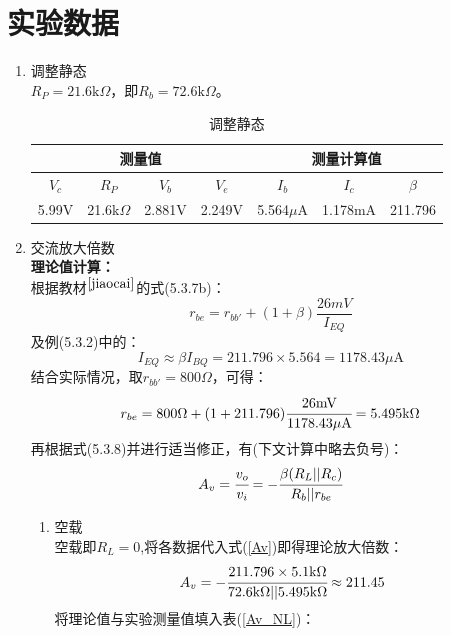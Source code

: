 \documentclass[a4paper]{article}
\begin{document}
\section{实验数据}
\begin{enumerate}
\item 调整静态\\
$R_P = 21.6\text{k}\Omega$，即$R_b = 72.6\text{k}\Omega$。
\begin{table}[!h]
\centering
\caption{调整静态}
\label{Q}
\begin{tabular}{c|c|c|c|c|c|c}
\hline
\multicolumn{4}{c|}{测量值}               & \multicolumn{3}{c}{测量计算值}      \\ \hline
$V_c$ & $R_P$         & $V_b$  & $V_e$  & $I_b$       & $I_c$   & $\beta$ \\ \hline
5.99V & 21.6k$\Omega$ & 2.881V & 2.249V & 5.564$\mu$A & 1.178mA & 211.796 \\ \hline
\end{tabular}
\end{table}
\item 交流放大倍数\\
\textbf{理论值计算：}\\
根据教材$^{\cite{jiaocai}}$的式(5.3.7b)：
\begin{equation}
r_{be} = r_{bb'} + (1+\beta)\frac{26mV}{I_{EQ}}\label{rbe}
\end{equation}
及例(5.3.2)中的：
\begin{equation}
I_{EQ} \approx \beta I_{BQ}=211.796\times5.564 =1178.43 \mu\text{A}
\end{equation}
结合实际情况，取$r_{bb'} = 800\Omega$，可得：
\begin{equation}
r_{be} = 800\Omega + (1+211.796)\cfrac{26\text{mV}}{1178.43 \mu\text{A}} = 5.495\text{k}\Omega
\end{equation}
再根据式(5.3.8)并进行适当修正，有(下文计算中略去负号)：
\begin{equation}
A_v = \cfrac{v_o}{v_i} = -\cfrac{\beta(R_L||R_c)}{R_b||r_{be}}\label{Av}
\end{equation}
\begin{enumerate}
\item 空载\\
空载即$R_L = 0$,将各数据代入式(\ref{Av})即得理论放大倍数：
\begin{equation}
A_v = -\cfrac{211.796\times5.1\text{k}\Omega}{72.6\text{k}\Omega || 5.495\text{k}\Omega} \approx 211.45
\end{equation}
将理论值与实验测量值填入表(\ref{Av_NL})：
\begin{table}[!h]

\end{table}
\end{enumerate}
\end{enumerate}
\end{document}
